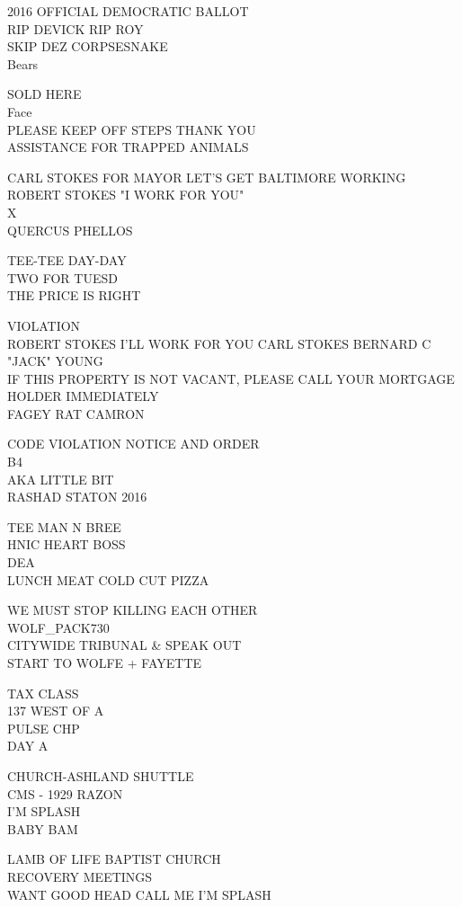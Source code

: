 \documentclass[10pt,letterpaper]{article}
\begin{document}
2016 OFFICIAL DEMOCRATIC BALLOT\\
RIP DEVICK RIP ROY\\
SKIP DEZ CORPSESNAKE\\
Bears

SOLD HERE\\
Face\\
PLEASE KEEP OFF STEPS THANK YOU\\
ASSISTANCE FOR TRAPPED ANIMALS

CARL STOKES FOR MAYOR LET'S GET BALTIMORE WORKING ROBERT STOKES "I WORK FOR YOU"\\
X\\
QUERCUS PHELLOS

TEE{-}TEE DAY{-}DAY\\
TWO FOR TUESD\\
THE PRICE IS RIGHT

VIOLATION\\
ROBERT STOKES I'LL WORK FOR YOU CARL STOKES BERNARD C "JACK" YOUNG\\
IF THIS PROPERTY IS NOT VACANT, PLEASE CALL YOUR MORTGAGE HOLDER IMMEDIATELY\\
FAGEY RAT CAMRON

CODE VIOLATION NOTICE AND ORDER\\
B4\\
AKA LITTLE BIT\\
RASHAD STATON 2016

TEE MAN N BREE\\
HNIC HEART BOSS\\
DEA\\
LUNCH MEAT COLD CUT PIZZA

WE MUST STOP KILLING EACH OTHER\\
WOLF\_PACK730\\
CITYWIDE TRIBUNAL \& SPEAK OUT\\
START TO WOLFE + FAYETTE

TAX CLASS\\
137 WEST OF A\\
PULSE CHP\\
DAY A

CHURCH{-}ASHLAND SHUTTLE\\
CMS {-} 1929 RAZON\\
I'M SPLASH\\
BABY BAM

LAMB OF LIFE BAPTIST CHURCH\\
RECOVERY MEETINGS\\
WANT GOOD HEAD CALL ME I'M SPLASH
\end{document}
